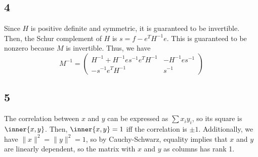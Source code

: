 \documentclass{article}
\newcommand{\openm}{\begin{pmatrix}}
\newcommand{\closem}{\end{pmatrix}}
\begin{document}
\subsection*{4}
Since $H$ is positive definite and symmetric, it is guaranteed to be invertible. Then, the Schur complement of $H$ is $s=f-e^TH^{-1}e$. This is guaranteed to be nonzero because $M$ is invertible. Thus, we have 
\[M^{-1}=\openm H^{-1}+H^{-1}es^{-1}e^TH^{-1}&-H^{-1}es^{-1}\\-s^{-1}e^TH^{-1}&s^{-1}\closem\]
\subsection*{5}
The correlation between $x$ and $y$ can be expressed as $\sum x_iy_i$, so its square is $\inner{x,y}$. Then, $\inner{x,y}=1$ iff the correlation is $\pm 1$. Additionally, we have $\|x\|^2=\|y\|^2=1$, so by Cauchy-Schwarz, equality implies that $x$ and $y$ are linearly dependent, so the matrix with $x$ and $y$ as columns has rank 1. 
\end{document}
